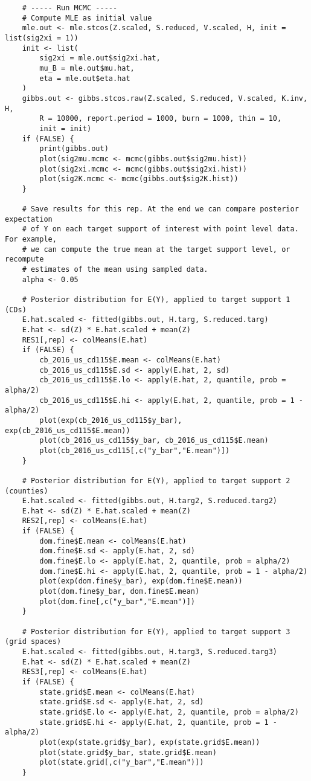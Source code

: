 \documentclass[12pt]{article}
\begin{document}
\begin{footnotesize}
\begin{verbatim}
    # ----- Run MCMC -----
    # Compute MLE as initial value
    mle.out <- mle.stcos(Z.scaled, S.reduced, V.scaled, H, init = list(sig2xi = 1))
    init <- list(
        sig2xi = mle.out$sig2xi.hat,
        mu_B = mle.out$mu.hat,
        eta = mle.out$eta.hat
    )
    gibbs.out <- gibbs.stcos.raw(Z.scaled, S.reduced, V.scaled, K.inv, H,
        R = 10000, report.period = 1000, burn = 1000, thin = 10,
        init = init)
    if (FALSE) {
        print(gibbs.out)
        plot(sig2mu.mcmc <- mcmc(gibbs.out$sig2mu.hist))
        plot(sig2xi.mcmc <- mcmc(gibbs.out$sig2xi.hist))
        plot(sig2K.mcmc <- mcmc(gibbs.out$sig2K.hist))
    }

    # Save results for this rep. At the end we can compare posterior expectation
    # of Y on each target support of interest with point level data. For example,
    # we can compute the true mean at the target support level, or recompute
    # estimates of the mean using sampled data.
    alpha <- 0.05

    # Posterior distribution for E(Y), applied to target support 1 (CDs)
    E.hat.scaled <- fitted(gibbs.out, H.targ, S.reduced.targ)
    E.hat <- sd(Z) * E.hat.scaled + mean(Z)
    RES1[,rep] <- colMeans(E.hat)
    if (FALSE) {
        cb_2016_us_cd115$E.mean <- colMeans(E.hat)
        cb_2016_us_cd115$E.sd <- apply(E.hat, 2, sd)
        cb_2016_us_cd115$E.lo <- apply(E.hat, 2, quantile, prob = alpha/2)
        cb_2016_us_cd115$E.hi <- apply(E.hat, 2, quantile, prob = 1 - alpha/2)
        plot(exp(cb_2016_us_cd115$y_bar), exp(cb_2016_us_cd115$E.mean))
        plot(cb_2016_us_cd115$y_bar, cb_2016_us_cd115$E.mean)
        plot(cb_2016_us_cd115[,c("y_bar","E.mean")])
    }
    
    # Posterior distribution for E(Y), applied to target support 2 (counties)
    E.hat.scaled <- fitted(gibbs.out, H.targ2, S.reduced.targ2)
    E.hat <- sd(Z) * E.hat.scaled + mean(Z)
    RES2[,rep] <- colMeans(E.hat)
    if (FALSE) {
        dom.fine$E.mean <- colMeans(E.hat)
        dom.fine$E.sd <- apply(E.hat, 2, sd)
        dom.fine$E.lo <- apply(E.hat, 2, quantile, prob = alpha/2)
        dom.fine$E.hi <- apply(E.hat, 2, quantile, prob = 1 - alpha/2)
        plot(exp(dom.fine$y_bar), exp(dom.fine$E.mean))
        plot(dom.fine$y_bar, dom.fine$E.mean)
        plot(dom.fine[,c("y_bar","E.mean")])
    }

    # Posterior distribution for E(Y), applied to target support 3 (grid spaces)
    E.hat.scaled <- fitted(gibbs.out, H.targ3, S.reduced.targ3)
    E.hat <- sd(Z) * E.hat.scaled + mean(Z)
    RES3[,rep] <- colMeans(E.hat)
    if (FALSE) {
        state.grid$E.mean <- colMeans(E.hat)
        state.grid$E.sd <- apply(E.hat, 2, sd)
        state.grid$E.lo <- apply(E.hat, 2, quantile, prob = alpha/2)
        state.grid$E.hi <- apply(E.hat, 2, quantile, prob = 1 - alpha/2)
        plot(exp(state.grid$y_bar), exp(state.grid$E.mean))
        plot(state.grid$y_bar, state.grid$E.mean)
        plot(state.grid[,c("y_bar","E.mean")])
    }


\end{verbatim}
\end{footnotesize}
\end{document}
